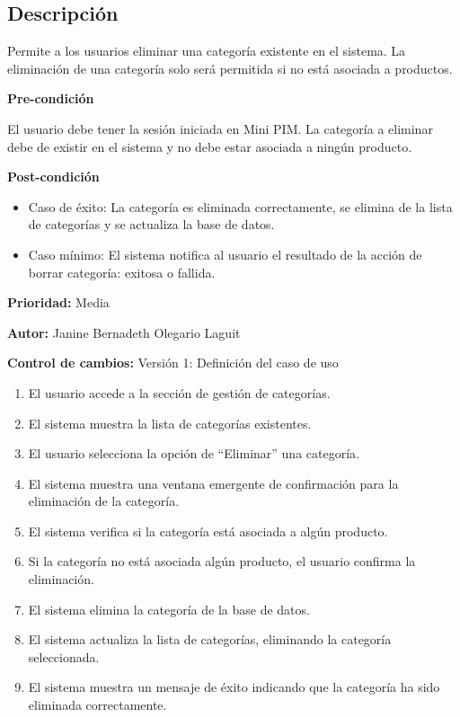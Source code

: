 \newpage %


\subsection*{Descripción}
Permite a los usuarios eliminar una categoría existente en el sistema. La eliminación de una categoría solo será permitida si no está asociada a productos.\par
\vspace{0.15cm}

\textbf{Pre-condición}\par
El usuario debe tener la sesión iniciada en Mini PIM. La categoría a eliminar debe de existir en el sistema y no debe estar asociada a ningún producto.\par
\vspace{0.15cm}

\textbf{Post-condición}
\begin{itemize}
    \item Caso de éxito: La categoría es eliminada correctamente, se elimina de la lista de categorías y se actualiza la base de datos.
    \item Caso mínimo: El sistema notifica al usuario el resultado de la acción de borrar categoría: exitosa o fallida.
\end{itemize}

\textbf{Prioridad: }
Media
\vspace{0.15cm}

\textbf{Autor: }
Janine Bernadeth Olegario Laguit\par
\vspace{0.15cm}

\textbf{Control de cambios: } Versión 1: Definición del caso de uso

\begin{enumerate}
    \item El usuario accede a la sección de gestión de categorías.
    \item El sistema muestra la lista de categorías existentes.
    \item El usuario selecciona la opción de \enquote{Eliminar} una categoría.
    \item El sistema muestra una ventana emergente de confirmación para la eliminación de la categoría.
    \item El sistema verifica si la categoría está asociada a algún producto.
    \item Si la categoría no está asociada algún producto, el usuario confirma la eliminación.
    \item El sistema elimina la categoría de la base de datos.
    \item El sistema actualiza la lista de categorías, eliminando la categoría seleccionada.
    \item El sistema muestra un mensaje de éxito indicando que la categoría ha sido eliminada correctamente.
\end{enumerate}

